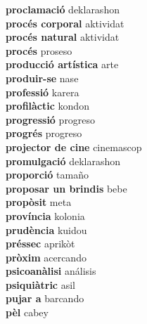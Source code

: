\textbf{ proclamació  } deklarashon \\
\textbf{ procés corporal  } aktividat \\
\textbf{ procés natural  } aktividat \\
\textbf{ procés  } proseso \\
\textbf{ producció artística  } arte \\
\textbf{ produir-se  } nase \\
\textbf{ professió  } karera \\
\textbf{ profilàctic  } kondon \\
\textbf{ progressió  } progreso \\
\textbf{ progrés  } progreso \\
\textbf{ projector de cine  } cinemascop \\
\textbf{ promulgació  } deklarashon \\
\textbf{ proporció  } tamaño \\
\textbf{ proposar un brindis  } bebe \\
\textbf{ propòsit  } meta \\
\textbf{ província  } kolonia \\
\textbf{ prudència  } kuidou \\
\textbf{ préssec  } aprikòt \\
\textbf{ pròxim  } acercando \\
\textbf{ psicoanàlisi  } análisis \\
\textbf{ psiquiàtric  } asil \\
\textbf{ pujar a  } barcando \\
\textbf{ pèl  } cabey \\
